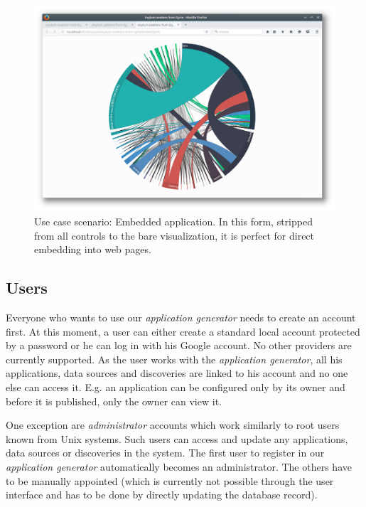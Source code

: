 \begin{figure}
	\centering
	\includegraphics[width=145mm]{img/05_scenario_11_embedded_application}
	\caption{Use case scenario: Embedded application. In this form, stripped from all controls to the bare visualization, it is perfect for direct embedding into web pages.}
    \label{fig:scenario-11-embedded-application}
\end{figure}


\subsection{Users}

Everyone who wants to use our \emph{application generator} needs to create an account first. At this moment, a user can either create a standard local account protected by a password or he can log in with his Google account. No other providers are currently supported. As the user works with the \emph{application generator}, all his applications, data sources and discoveries are linked to his account and no one else can access it. E.g. an application can be configured only by its owner and before it is published, only the owner can view it.

One exception are \emph{administrator} accounts which work similarly to root users known from Unix systems. Such users can access and update any applications, data sources or discoveries in the system. The first user to register in our \emph{application generator} automatically becomes an administrator. The others have to be manually appointed (which is currently not possible through the user interface and has to be done by directly updating the database record).

